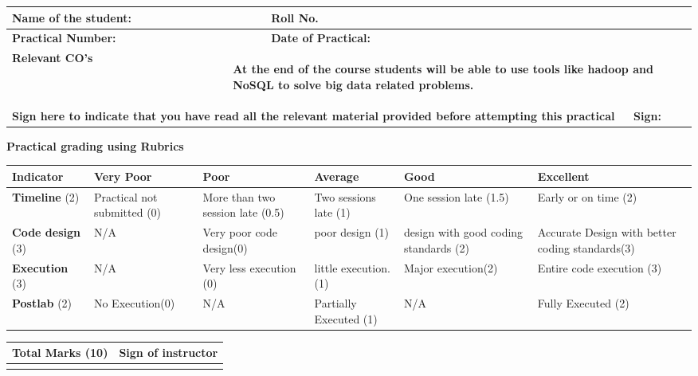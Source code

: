 \documentclass[11pt,article]{memoir}
\begin{document}
\sloppy
\fancypage{\doublebox}{}
\begin{flushleft}


    \begin{tabular}{ | p{4cm} | p{5cm} | p{3.5cm} | p{2cm} |}
    \hline

    \textbf{Name of the student:}& &\textbf{Roll No.} & \\ \hline
    \textbf{Practical Number:}& & \textbf{Date of Practical:} & \\ \hline
	\textbf{Relevant CO's} & \multicolumn{3}{|p{10.5cm}|}{\begin{flushleft}
	\textbf{At the end of the course students will be able to use tools like hadoop and NoSQL to solve big data related problems.}
	\end{flushleft}}\\
    \hline
    \multicolumn{3}{|p{12.5cm}|}{\textbf{Sign here to indicate that you have read all the relevant material provided before attempting this practical}}& \textbf{Sign:}\\ \hline
    \end{tabular}
    \vspace{1cm}
        \textbf{Practical grading using Rubrics}
           \begin{tabular}{|p{2cm}|p{2cm}|p{2cm}|p{2cm}|p{2cm}|p{2cm}|}
           \hline \textbf{Indicator} & \textbf{Very Poor} & \textbf{Poor} & \textbf{Average} & \textbf{Good} & \textbf{Excellent} \\ 
           \hline \textbf{Timeline} (2) & Practical not submitted (0) & More than two session late (0.5) & Two sessions late (1) & One session late (1.5) & Early or on time (2) \\ 
           \hline \textbf{Code design} (3) & N/A & Very poor code design(0) & poor design (1) & design with good coding standards (2) & Accurate Design with better coding standards(3) \\ 
           \hline \textbf{Execution} (3) & N/A & Very less execution (0)
            & little execution.(1) & Major execution(2)
            & Entire code execution (3) \\ 
           \hline \textbf{Postlab} (2) & No Execution(0) & N/A& Partially Executed (1) & N/A & Fully Executed (2) \\ 
           \hline 
           \end{tabular}
        \vspace{-8cm}
        \begin{table}[h!]
        \centering
        \begin{tabular}{|c|c|}
                \hline \textbf{Total Marks (10)} & \textbf{Sign of instructor} \\ 
                \hline  &  \\ 
                \hline 
                \end{tabular} 
        \end{table}
        

\end{flushleft}
\end{document}
